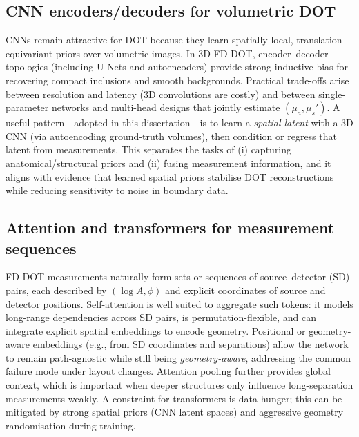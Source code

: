 \subsection{CNN encoders/decoders for volumetric DOT}
CNNs remain attractive for DOT because they learn spatially local, translation-equivariant priors over volumetric images. In 3D FD-DOT, encoder–decoder topologies (including U-Nets and autoencoders) provide strong inductive bias for recovering compact inclusions and smooth backgrounds. Practical trade-offs arise between resolution and latency (3D convolutions are costly) and between single-parameter networks and multi-head designs that jointly estimate $(\mu_a,\mu_s')$. A useful pattern—adopted in this dissertation—is to learn a \emph{spatial latent} with a 3D CNN (via autoencoding ground-truth volumes), then condition or regress that latent from measurements. This separates the tasks of (i) capturing anatomical/structural priors and (ii) fusing measurement information, and it aligns with evidence that learned spatial priors stabilise DOT reconstructions while reducing sensitivity to noise in boundary data.

\subsection{Attention and transformers for measurement sequences}
FD-DOT measurements naturally form sets or sequences of source–detector (SD) pairs, each described by $(\log A,\phi)$ and explicit coordinates of source and detector positions. Self-attention is well suited to aggregate such tokens: it models long-range dependencies across SD pairs, is permutation-flexible, and can integrate explicit spatial embeddings to encode geometry. Positional or geometry-aware embeddings (e.g., from SD coordinates and separations) allow the network to remain path-agnostic while still being \emph{geometry-aware}, addressing the common failure mode under layout changes. Attention pooling further provides global context, which is important when deeper structures only influence long-separation measurements weakly. A constraint for transformers is data hunger; this can be mitigated by strong spatial priors (CNN latent spaces) and aggressive geometry randomisation during training.

